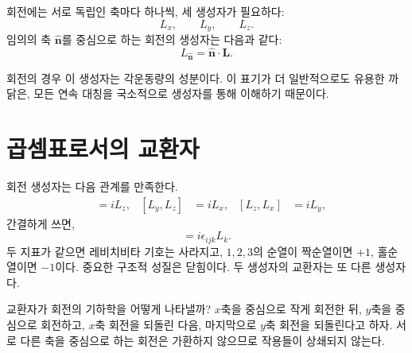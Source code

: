 회전에는 서로 독립인 축마다 하나씩, 세 생성자가 필요하다:
\begin{equation}
L_x,\qquad L_y,\qquad L_z.
\end{equation}
임의의 축 \(\widehat{\bm n}\)를 중심으로 하는 회전의 생성자는 다음과 같다:
\begin{equation}
L_{\widehat{\bm n}}=\widehat{\bm n}\cdot\bm L.
\end{equation}

\begin{classroomqa}
\end{classroomqa}

회전의 경우 이 생성자는 각운동량의 성분이다. 이 표기가 더 일반적으로도 유용한 까닭은, 모든 연속 대칭을 국소적으로 생성자를 통해 이해하기 때문이다.

\section{곱셈표로서의 교환자}

회전 생성자는 다음 관계를 만족한다.
\begin{align}
[L_x,L_y]&=iL_z,&
[L_y,L_z]&=iL_x,&
[L_z,L_x]&=iL_y,
\end{align}
간결하게 쓰면,
\begin{equation}
[L_i,L_j]=i\epsilon_{ijk}L_k.
\end{equation}
두 지표가 같으면 레비치비타 기호는 사라지고, \(1,2,3\)의 순열이 짝순열이면 \(+1\), 홀순열이면 \(-1\)이다. 중요한 구조적 성질은 닫힘이다. 두 생성자의 교환자는 또 다른 생성자다.

교환자가 회전의 기하학을 어떻게 나타낼까? \(x\)축을 중심으로 작게 회전한 뒤, \(y\)축을 중심으로 회전하고, \(x\)축 회전을 되돌린 다음, 마지막으로 \(y\)축 회전을 되돌린다고 하자. 서로 다른 축을 중심으로 하는 회전은 가환하지 않으므로 작용들이 상쇄되지 않는다.

\begin{classroomqa}
\end{classroomqa}

